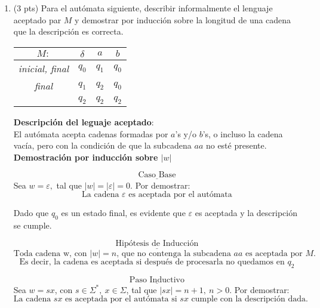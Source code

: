 \documentclass{article}
\begin{document}
\begin{enumerate}
\begin{enumerate}
\begin{center}
        \end{center}
    \end{enumerate}
    \newpage
    \item (3 pts) Para el autómata siguiente, describir informalmente el lenguaje aceptado par $M$ y demostrar por inducción sobre la longitud de una cadena que la descripción es correcta. \\
    
    \begin{table}[h]
        \centering
        \begin{tabular}{c c| c | c}
            $M:$ & $\delta$ & $a$ & $b$ \\
            \hline
            \textit{inicial, final} & $q_0$ & $q_1$ & $q_0$ \\
            \textit{final} & $q_1$ & $q_2$ & $q_0$ \\
            & $q_2$ & $q_2$ & $q_2$
        \end{tabular}
    \end{table}
    \textbf{Descripción del leguaje aceptado}: \\
    El autómata acepta cadenas formadas por $a$'s y/o $b$'s, o incluso la cadena vacía, pero con la condición de que la subcadena $aa$ no esté presente.\\
    
    \textbf{Demostración por inducción sobre $|w|$}
    
    $$\underline{\text{Caso Base}}$$  
    Sea $w = \varepsilon,$ tal que $|w| = |\varepsilon| = 0$. Por demostrar: $$\text{La cadena $\varepsilon$ es aceptada por el autómata}$$

    Dado que $q_0$ es un estado final, es evidente que $\varepsilon$ es aceptada y la descripción se cumple.
    
    $$\underline{\text{Hipótesis de Inducción}}$$
    $$\text{Toda cadena w, con $|w| = n$, que no contenga la subcadena $aa$ es aceptada por $M$.}$$
    $$\text{Es decir, la cadena es aceptada si después de procesarla no quedamos en $q_2$}$$
    
    $$\underline{\text{Paso Inductivo}}$$  
    Sea $w = sx$, con $s \in \Sigma^*,~x \in \Sigma$, tal que $|sx| = n + 1,~ n >0$. Por demostrar: $$\text{La cadena $sx$ es aceptada por el autómata si $sx$ cumple con la descripción dada. }$$


\end{enumerate}
\end{document}
